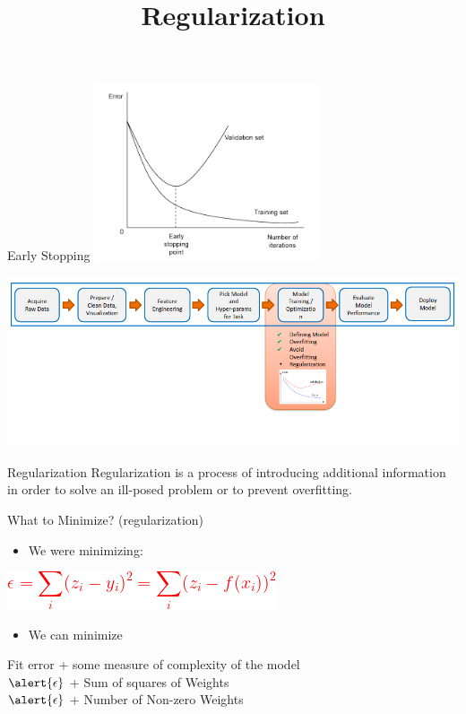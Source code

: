 \documentclass[aspectratio=169,14pt,usenames,dvipsnames]{beamer}
\begin{document}
\begin{frame}{Early Stopping}
\centering
\includegraphics[width=0.5\textwidth, height=0.6\textheight]{Images/AIML_OFG_18.png}
\end{frame}


\begin{frame}

\includegraphics[width=1.015\textwidth, height=0.7\textheight]{Images/AIML_OFG_19.png}
\end{frame}

{\1
\begin{frame} \vspace{35pt}
	\title[Regularization]{Regularization}
	\maketitle
\end{frame}
}

\begin{frame}{Regularization}
\centering
Regularization is a process of introducing additional information in order to solve an ill-posed problem or to prevent overfitting.
\end{frame}

\begin{frame}{What to Minimize? (regularization)}
\begin{itemize}
\item We were minimizing:
\end{itemize}
\centering
\includegraphics{Images/AIML_OFG_20.png}
\begin{itemize}
\item We can minimize
\end{itemize}
Fit error + some measure of complexity of the model \\
\centering
$\alert{\epsilon}$ + Sum of squares of Weights \\
\centering
$\alert{\epsilon}$ + Number of Non-zero Weights
\end{frame}
\end{document}
